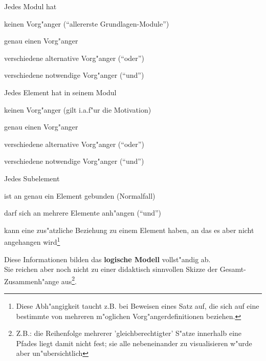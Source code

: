 Jedes Modul hat 
\begin{list_sabina}
        \item keinen Vorg"anger (``allererste Grundlagen-Module'')
        \item genau einen Vorg"anger
        \item verschiedene alternative Vorg"anger (``oder'')
        \item verschiedene notwendige Vorg"anger (``und'')
\end{list_sabina}


Jedes Element hat in seinem Modul 
\begin{list_sabina}
        \item keinen Vorg"anger (gilt i.a.f"ur die Motivation)
        \item genau einen Vorg"anger
        \item verschiedene alternative Vorg"anger (``oder'')
        \item verschiedene notwendige Vorg"anger (``und'')
\end{list_sabina}


Jedes Subelement 
\begin{list_sabina}
        \item ist an genau ein Element gebunden (Normalfall)
        \item darf sich an mehrere Elemente anh"angen (``und'')
        \item kann eine zus"atzliche Beziehung zu einem Element haben, 
	an das es aber nicht angehangen wird\footnote{Diese Abh"angigkeit 
	taucht z.B. bei Beweisen eines Satz auf, die sich auf eine 
	bestimmte von mehreren m"oglichen Vorg"angerdefinitionen   
	beziehen.}
\end{list_sabina}

Diese Informationen bilden das \textbf{logische Modell} vollst"andig
ab.\\ 
Sie reichen aber noch nicht zu einer didaktisch sinnvollen Skizze der
Gesamt-Zusammenh"ange aus\footnote{Z.B.: die Reihenfolge mehrerer
'gleichberechtigter' S"atze innerhalb eine Pfades liegt damit nicht
fest; sie alle nebeneinander zu visualisieren w"urde aber
un"ubersichtlich}.



